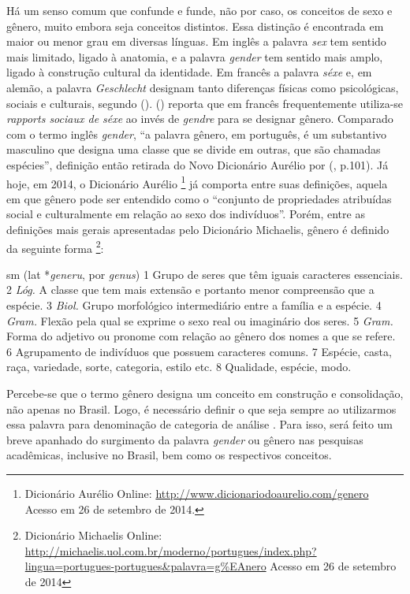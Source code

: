 Há um senso comum que confunde e funde, não por caso, os conceitos de sexo e gênero, muito embora seja conceitos distintos. Essa distinção é encontrada em maior ou menor grau em diversas línguas. Em inglês a palavra \emph{sex} tem sentido mais limitado, ligado à anatomia, e a palavra \emph{gender} tem sentido mais amplo, ligado à construção cultural da identidade. Em francês a palavra \emph{séxe} e, em alemão, a palavra \emph{Geschlecht} designam tanto diferenças físicas como psicológicas, sociais e culturais, segundo  (\citeyear{FRAISSE2001}).  (\citeyear{MORAES1998}) reporta que em francês frequentemente utiliza-se \emph{rapports sociaux de séxe} ao invés de \emph{gendre} para se designar gênero. Comparado com o termo inglês \emph{gender}, ``a palavra gênero, em português, é um substantivo masculino que designa uma classe que se divide em outras, que são chamadas espécies'', definição então retirada do Novo Dicionário Aurélio por  (\citeyear{MORAES1998}, p.101).
Já hoje, em 2014, o Dicionário Aurélio
\footnote{Dicionário Aurélio Online: \url{http://www.dicionariodoaurelio.com/genero} Acesso em 26 de setembro de 2014.}
já comporta entre suas definições, aquela em que gênero pode ser entendido como o ``conjunto de propriedades atribuídas social e culturalmente em relação ao sexo dos indivíduos''.
Porém, entre as definições mais gerais apresentadas pelo Dicionário Michaelis, gênero é definido da seguinte forma
\footnote{Dicionário Michaelis Online: \url{http://michaelis.uol.com.br/moderno/portugues/index.php?lingua=portugues-portugues&palavra=g\%EAnero} Acesso em 26 de setembro de 2014}:

\begin{citacao}
sm (lat *\emph{generu}, por \emph{genus}) 1 Grupo de seres que têm iguais caracteres essenciais. 2 \emph{Lóg.} A classe que tem mais extensão e portanto menor compreensão que a espécie. 3 \emph{Biol.} Grupo morfológico intermediário entre a família e a espécie. 4 \emph{Gram.} Flexão pela qual se exprime o sexo real ou imaginário dos seres. 5 \emph{Gram.} Forma do adjetivo ou pronome com relação ao gênero dos nomes a que se refere. 6 Agrupamento de indivíduos que possuem caracteres comuns. 7 Espécie, casta, raça, variedade, sorte, categoria, estilo etc. 8 Qualidade, espécie, modo.
\end{citacao}

Percebe-se que o termo gênero designa um conceito em construção e consolidação, não apenas no Brasil. Logo, é necessário definir o que seja sempre ao utilizarmos essa palavra para denominação de categoria de análise \cite{MORAES1998}. Para isso, será feito um breve apanhado do surgimento da palavra \emph{gender} ou gênero nas pesquisas acadêmicas, inclusive no Brasil, bem como os respectivos conceitos.

